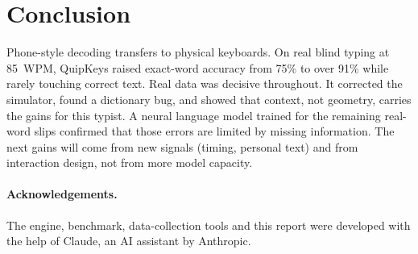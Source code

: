 \documentclass[11pt,a4paper]{article}
\newcommand{\qk}{QuipKeys}
\begin{document}
\section{Conclusion}
Phone-style decoding transfers to physical keyboards. On real blind typing at 85~WPM, \qk{} raised exact-word accuracy from 75\% to over 91\% while rarely touching correct text. Real data was decisive throughout. It corrected the simulator, found a dictionary bug, and showed that context, not geometry, carries the gains for this typist. A neural language model trained for the remaining real-word slips confirmed that those errors are limited by missing information. The next gains will come from new signals (timing, personal text) and from interaction design, not from more model capacity.

\paragraph{Acknowledgements.} The engine, benchmark, data-collection tools and this report were developed with the help of Claude, an AI assistant by Anthropic.



\end{document}
